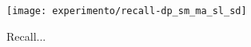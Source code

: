 \begin{figure}[!htb] \centering 
  \centering
  \texttt{[image: experimento/recall-dp\_sm\_ma\_sl\_sd]} 
  \caption{Recall... } 
  \label{fig:recall_result}
\end{figure}

 


 

 


 

